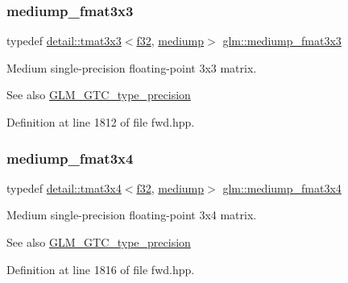 \subsubsection{\texorpdfstring{mediump\+\_\+fmat3x3}{mediump\_fmat3x3}}
{\footnotesize\ttfamily typedef \hyperlink{structglm_1_1detail_1_1tmat3x3}{detail\+::tmat3x3}$<$\hyperlink{group__gtc__type__precision_ga0ec999b57f5330d9021256e96038df04}{f32}, \hyperlink{namespaceglm_a0f04f086094c747d227af4425893f545a6416f3ea0c9025fb21ed50c4d6620482}{mediump}$>$ \hyperlink{group__gtc__type__precision_gaa7f015dd5b962a658178bb881d4620cc}{glm\+::mediump\+\_\+fmat3x3}}

Medium single-\/precision floating-\/point 3x3 matrix. \begin{DoxySeeAlso}{See also}
\hyperlink{group__gtc__type__precision}{G\+L\+M\+\_\+\+G\+T\+C\+\_\+type\+\_\+precision} 
\end{DoxySeeAlso}


Definition at line 1812 of file fwd.\+hpp.

\mbox{\label{group__gtc__type__precision_gafa5aaa948365f349840dfeb9eeebf0cd}} 
\subsubsection{\texorpdfstring{mediump\+\_\+fmat3x4}{mediump\_fmat3x4}}
{\footnotesize\ttfamily typedef \hyperlink{structglm_1_1detail_1_1tmat3x4}{detail\+::tmat3x4}$<$\hyperlink{group__gtc__type__precision_ga0ec999b57f5330d9021256e96038df04}{f32}, \hyperlink{namespaceglm_a0f04f086094c747d227af4425893f545a6416f3ea0c9025fb21ed50c4d6620482}{mediump}$>$ \hyperlink{group__gtc__type__precision_gafa5aaa948365f349840dfeb9eeebf0cd}{glm\+::mediump\+\_\+fmat3x4}}

Medium single-\/precision floating-\/point 3x4 matrix. \begin{DoxySeeAlso}{See also}
\hyperlink{group__gtc__type__precision}{G\+L\+M\+\_\+\+G\+T\+C\+\_\+type\+\_\+precision} 
\end{DoxySeeAlso}


Definition at line 1816 of file fwd.\+hpp.

\mbox{\label{group__gtc__type__precision_ga6cd3ae1f3509b79061edcc83564769d4}} 
